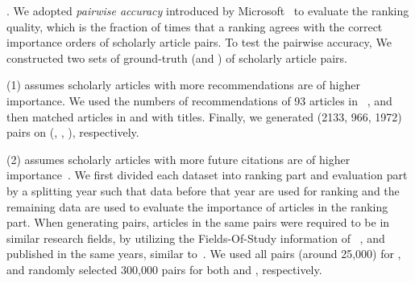 .
We adopted {\em pairwise accuracy} introduced by Microsoft~\cite{Richardson06:BPR,wsdmcup} to evaluate the ranking quality, which is the fraction of times that a ranking agrees with the correct importance orders of scholarly article pairs.
%
To test the pairwise accuracy, We constructed two sets of ground-truth (\recom and \fcita) of scholarly article pairs.

\noindent
(1) \recom assumes scholarly articles with more recommendations are of higher importance.
We used the numbers of recommendations of 93 articles in \aan~\cite{Liang16AAAI}, %
and then matched articles in \aminer and \magdata with titles. %
Finally, we generated (2133, 966, 1972) pairs on (\aan, \aminer, \magdata), respectively.


\noindent
(2) \fcita assumes scholarly articles with more future citations are of higher importance~\cite{Wang13AAAI,Wang16TIST,Li08TSRanking}.
We first divided each dataset into ranking part and evaluation part by a splitting year such that data before that year are used for ranking and the remaining data are used to evaluate the importance of articles in the ranking part.
When generating pairs, articles in the same pairs were required to be in similar research fields, by utilizing the Fields-Of-Study information of \magdata~\cite{Sinha15:MAG}, and published in the same years, similar to~\cite{Wang16TIST}.
We used all pairs (around 25,000) for \aan, and randomly selected 300,000 pairs for both \aminer and \magdata, respectively.


